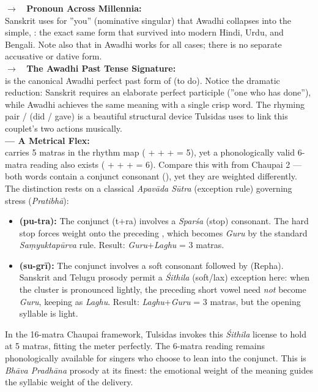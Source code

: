 \begin{tcolorbox}[poetrybox]
\textbf{ $\rightarrow$  \gotchaicon\  Pronoun Across Millennia:}\\
Sanskrit uses  for ''you'' (nominative singular) that Awadhi collapses into the simple, : the exact same form that survived into modern Hindi, Urdu, and Bengali. 
Note also that  in Awadhi works for all cases;
 there is no separate accusative or dative form.\\[0.4em]
\textbf{ $\rightarrow$  \gotchaicon\  The Awadhi Past Tense Signature:}\\
 is the canonical Awadhi perfect past form of  (to do). 
Notice the dramatic reduction: Sanskrit requires an elaborate perfect participle  (''one who has done''), while Awadhi achieves the same meaning with a single crisp word. 
The rhyming pair  /  (did / gave) is a beautiful structural device Tulsidas uses to link this couplet's two actions musically.\\[0.4em]
\textbf{ — A Metrical Flex:}\\
 carries 5 matras in the rhythm map ( +  +  +  = 5), yet a phonologically valid 6-matra reading also exists ( +  +  +  = 6). Compare this with  from Chaupai 2 — both words contain a conjunct consonant (), yet they are weighted differently. The distinction rests on a classical \textit{Apavāda Sūtra} (exception rule) governing stress (\textit{Pratibhā}):

\begin{itemize}
  \item \textbf{ (pu-tra):} The conjunct  (t+ra) involves a \textit{Sparśa} (stop) consonant. 
  The hard stop forces weight onto the preceding , which becomes \textit{Guru} by the standard \textit{Saṃyuktapūrva} rule. 
  Result: \textit{Guru}+\textit{Laghu} = 3 matras.

  \item \textbf{ (su-grī):} The conjunct  involves a soft consonant followed by  (Repha). 
  Sanskrit and Telugu prosody permit a \textit{Śithila} (soft/lax) exception here: when the cluster is pronounced lightly, the preceding short vowel need \emph{not} become \textit{Guru}, keeping  as \textit{Laghu}. 
  Result: \textit{Laghu}+\textit{Guru} = 3 matras, but the opening syllable is light.
\end{itemize}

In the 16-matra Chaupai framework, Tulsidas invokes this \textit{Śithila} license to hold  at 5 matras, fitting the meter perfectly. 
The 6-matra reading remains phonologically available for singers who choose to lean into the conjunct. 
This is \textit{Bhāva Pradhāna} prosody at its finest: the emotional weight of the meaning guides the syllabic weight of the delivery.
\end{tcolorbox}

\newpage
